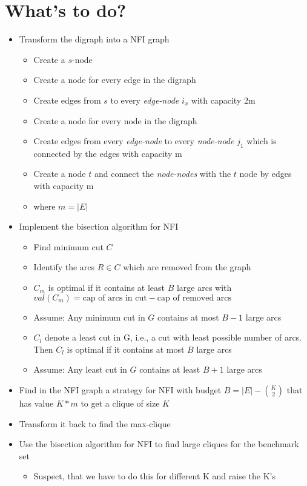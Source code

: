 \documentclass{article}
\begin{document}
\section{What's to do?}
\begin{itemize}
    \item Transform the digraph into a NFI graph
    \begin{itemize}
        \item Create a $s$-node
        \item Create a node for every edge in the digraph
        \item Create edges from $s$ to every \emph{edge-node} $i_x$ with capacity 2m
        \item Create a node for every node in the digraph
        \item Create edges from every \emph{edge-node} to every \emph{node-node} $j_1$ which is connected by the edges with capacity m
        \item Create a node $t$ and connect the \emph{node-nodes} with the $t$ node by edges with capacity m
        \item where $m = |E|$
    \end{itemize}
    \item Implement the bisection algorithm for NFI
    \begin{itemize}
        \item Find minimum cut $C$
        \item Identify the arcs $R \in C$ which are removed from the graph
        \item $C_m$ is optimal if it contains at least $B$ large arcs with $val(C_m) = \text{cap of arcs in cut} - \text{cap of removed arcs}$
        \item Assume: Any minimum cut in $G$ contains at most $B-1$ large arcs
        \item $C_l$ denote a least cut in G, i.e.,  a cut with least possible number of arcs. Then $C_l$ is optimal if it contains at most $B$ large arcs
        \item Assume: Any least cut in $G$ contains at least $B+1$ large arcs
    \end{itemize}
    \item Find in the NFI graph a strategy for NFI with budget $B = |E| - \binom{K}{2} $ that has value $K*m$ to get a clique of size $K$
    \item Transform it back to find the max-clique
    \item Use the bisection algorithm for NFI to find large cliques for the benchmark set
    \begin{itemize}
        \item Suspect, that we have to do this for different K and raise the K's
    \end{itemize}
\end{itemize}
\end{document}
